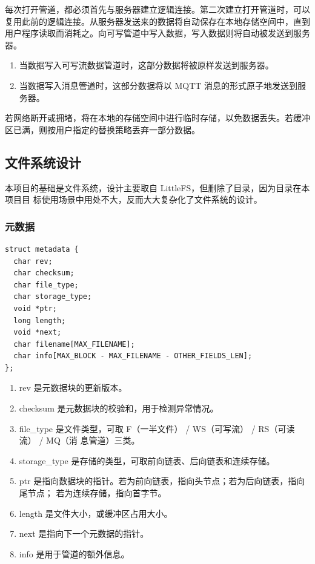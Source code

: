 \documentclass{ctexart}
\begin{document}
每次打开管道，都必须首先与服务器建立逻辑连接。第二次建立打开管道时，可以复用此前的逻辑连接。从服务器发送来的数据将自动保存在本地存储空间中，直到用户程序读取而消耗之。向可写管道中写入数据，写入数据则将自动被发送到服务器。
\begin{enumerate}
	\item 当数据写入可写流数据管道时，这部分数据将被原样发送到服务器。
	\item 当数据写入消息管道时，这部分数据将以 MQTT 消息的形式原子地发送到服务器。
\end{enumerate}
若网络断开或拥堵，将在本地的存储空间中进行临时存储，以免数据丢失。若缓冲区已满，则按用户指定的替换策略丢弃一部分数据。

\subsection{文件系统设计}
\label{design-fs}
本项目的基础是文件系统，设计主要取自 LittleFS，但删除了目录，因为目录在本项目目
标使用场景中用处不大，反而大大复杂化了文件系统的设计。

\subsubsection{元数据}
\begin{verbatim}
struct metadata {
  char rev;
  char checksum;
  char file_type;
  char storage_type;
  void *ptr;
  long length;
  void *next;
  char filename[MAX_FILENAME];
  char info[MAX_BLOCK - MAX_FILENAME - OTHER_FIELDS_LEN];
};
\end{verbatim}

\begin{enumerate}
\item rev 是元数据块的更新版本。
\item checksum 是元数据块的校验和，用于检测异常情况。
\item file\_type 是文件类型，可取 F（一半文件） / WS（可写流） / RS（可读流） / MQ（消
  息管道）三类。
\item storage\_type 是存储的类型，可取前向链表、后向链表和连续存储。
\item ptr 是指向数据块的指针。若为前向链表，指向头节点；若为后向链表，指向尾节点；
  若为连续存储，指向首字节。
\item length 是文件大小，或缓冲区占用大小。
\item next 是指向下一个元数据的指针。
\item info 是用于管道的额外信息。
\end{enumerate}
\end{document}
